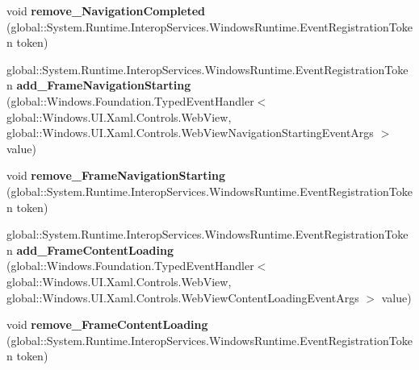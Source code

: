 \begin{DoxyCompactItemize}
\item 
\mbox{\label{interface_windows_1_1_u_i_1_1_xaml_1_1_controls_1_1_i_web_view2_a7c6af1243cf0100a4028f3aaaf48f8b2}} 
void {\bfseries remove\+\_\+\+Navigation\+Completed} (global\+::\+System.\+Runtime.\+Interop\+Services.\+Windows\+Runtime.\+Event\+Registration\+Token token)
\item 
\mbox{\label{interface_windows_1_1_u_i_1_1_xaml_1_1_controls_1_1_i_web_view2_ad33eb6ddf290983e9f6e350de4ac2d33}} 
global\+::\+System.\+Runtime.\+Interop\+Services.\+Windows\+Runtime.\+Event\+Registration\+Token {\bfseries add\+\_\+\+Frame\+Navigation\+Starting} (global\+::\+Windows.\+Foundation.\+Typed\+Event\+Handler$<$ global\+::\+Windows.\+U\+I.\+Xaml.\+Controls.\+Web\+View, global\+::\+Windows.\+U\+I.\+Xaml.\+Controls.\+Web\+View\+Navigation\+Starting\+Event\+Args $>$ value)
\item 
\mbox{\label{interface_windows_1_1_u_i_1_1_xaml_1_1_controls_1_1_i_web_view2_a93262ec1ba7af52f7ad156f65df18af8}} 
void {\bfseries remove\+\_\+\+Frame\+Navigation\+Starting} (global\+::\+System.\+Runtime.\+Interop\+Services.\+Windows\+Runtime.\+Event\+Registration\+Token token)
\item 
\mbox{\label{interface_windows_1_1_u_i_1_1_xaml_1_1_controls_1_1_i_web_view2_a131ab872c36d8541d45eadfe0d090bc5}} 
global\+::\+System.\+Runtime.\+Interop\+Services.\+Windows\+Runtime.\+Event\+Registration\+Token {\bfseries add\+\_\+\+Frame\+Content\+Loading} (global\+::\+Windows.\+Foundation.\+Typed\+Event\+Handler$<$ global\+::\+Windows.\+U\+I.\+Xaml.\+Controls.\+Web\+View, global\+::\+Windows.\+U\+I.\+Xaml.\+Controls.\+Web\+View\+Content\+Loading\+Event\+Args $>$ value)
\item 
\mbox{\label{interface_windows_1_1_u_i_1_1_xaml_1_1_controls_1_1_i_web_view2_a5b4a40e6d22653be9ab3f75aed948798}} 
void {\bfseries remove\+\_\+\+Frame\+Content\+Loading} (global\+::\+System.\+Runtime.\+Interop\+Services.\+Windows\+Runtime.\+Event\+Registration\+Token token)
\item 

\end{DoxyCompactItemize}
